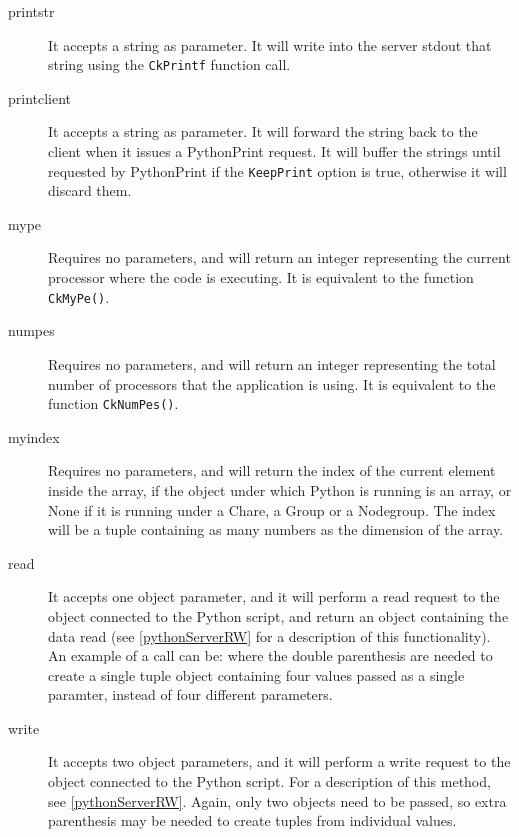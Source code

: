 \begin{description}

\item[printstr]
It accepts a string as parameter. It will write into the server stdout that string
using the \texttt{CkPrintf} function call.

\item[printclient]
It accepts a string as parameter. It will forward the string back to the client when it
issues a PythonPrint request. It will buffer the strings until requested by PythonPrint if the \texttt{KeepPrint}
option is true, otherwise it will discard them.

\item[mype]
Requires no parameters, and will return an integer representing the
current processor where the code is executing. It is equivalent to the \charmpp{}
function \texttt{CkMyPe()}.

\item[numpes]
Requires no parameters, and will return an integer representing the
total number of processors that the application is using. It is equivalent to
the \charmpp{} function \texttt{CkNumPes()}.

\item[myindex]
Requires no parameters, and will return the index of the current element
inside the array, if the object under which Python is running is an array, or
None if it is running under a Chare, a Group or a Nodegroup. The index will be a
tuple containing as many numbers as the dimension of the array.

\item[read]
It accepts one object parameter, and it will perform a read request to the
\charmpp{} object connected to the Python script, and return an object
containing the data read (see \ref{pythonServerRW} for a description of this
functionality). An example of a call can be:
where the double parenthesis are needed to create a single tuple object
containing four values passed as a single paramter, instead of four different
parameters.

\item[write]
It accepts two object parameters, and it will perform a write request to the
\charmpp{} object connected to the Python script. For a description of this
method, see \ref{pythonServerRW}. Again, only two objects need to be passed, so
extra parenthesis may be needed to create tuples from individual values.

\end{description}

